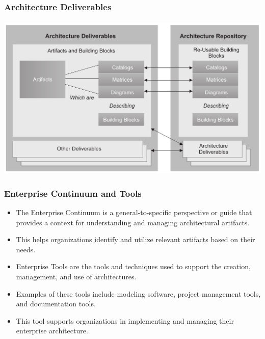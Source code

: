\documentclass[aspectratio=169, table]{beamer}
\begin{document}
    {
        \begin{frame}
            \frametitle{Architecture Deliverables}
            \framesubtitle{\hspace{1cm}}
            \begin{center}
                \includegraphics[width=.95\textwidth]{../figures/architecture_deliverables}
            \end{center}
        \end{frame}
    }



    \begin{frame}
        \frametitle{Enterprise Continuum and Tools}
        \vspace{20pt}
        \begin{itemize}
            \item The Enterprise Continuum is a general-to-specific perspective or guide that provides a context for understanding and managing architectural artifacts.
            \item This helps organizations identify and utilize relevant artifacts based on their needs.
            \item Enterprise Tools are the tools and techniques used to support the creation, management, and use of architectures.
            \item Examples of these tools include modeling software, project management tools, and documentation tools.
            \item This tool supports organizations in implementing and managing their enterprise architecture.
        \end{itemize}
    \end{frame}
\end{document}
